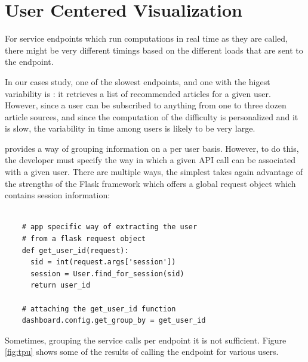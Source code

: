 \documentclass[conference]{IEEEtran}
\begin{document}
\section {User Centered Visualization}

  For service endpoints which run computations in real time as they are called, there might be very different timings based on the different loads that are sent to the endpoint. 

  In our cases study, one of the slowest endpoints, and one with the higest variability is \epFeedItems: it retrieves a list of recommended articles for a given user. However, since a user can be subscribed to anything from one to three dozen article sources, and since the computation of the difficulty is personalized and it is slow, the variability in time among users is likely to be very large. 

  \tool provides a way of grouping information on a per user basis. However, to do this, the developer must specify the way in which a given API call can be associated with a given user. There are multiple ways, the simplest takes again advantage of the strengths of the Flask framework which offers a global request object which contains session information: 

  \begin{lstlisting}[float,caption=Simply define a custom app-specific function for user retrieval and pass it to the \tool to group information by user,style=custompython]
    
    # app specific way of extracting the user
    # from a flask request object    
    def get_user_id(request):
      sid = int(request.args['session'])
      session = User.find_for_session(sid)
      return user_id

    # attaching the get_user_id function
    dashboard.config.get_group_by = get_user_id

  \end{lstlisting}


  Sometimes, grouping the service calls per endpoint it is not sufficient. Figure \ref{fig:tpu} shows some of the results of calling the \epFeedItems endpoint for various users. 
\end{document}
